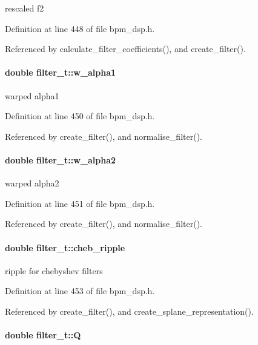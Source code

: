 rescaled f2 

Definition at line 448 of file bpm\_\-dsp.h.

Referenced by calculate\_\-filter\_\-coefficients(), and create\_\-filter().
\paragraph[w\_\-alpha1]{\setlength{\rightskip}{0pt plus 5cm}double {\bf filter\_\-t::w\_\-alpha1}}\hfill\label{structfilter__t_dc08473e572d2bb1b6442d7ccda22d7a}


warped alpha1 

Definition at line 450 of file bpm\_\-dsp.h.

Referenced by create\_\-filter(), and normalise\_\-filter().
\paragraph[w\_\-alpha2]{\setlength{\rightskip}{0pt plus 5cm}double {\bf filter\_\-t::w\_\-alpha2}}\hfill\label{structfilter__t_b1712c2f6e445670dd8e4063f2e281ad}


warped alpha2 

Definition at line 451 of file bpm\_\-dsp.h.

Referenced by create\_\-filter(), and normalise\_\-filter().
\paragraph[cheb\_\-ripple]{\setlength{\rightskip}{0pt plus 5cm}double {\bf filter\_\-t::cheb\_\-ripple}}\hfill\label{structfilter__t_674643ee7b183192df19cd3cd7e38a3d}


ripple for chebyshev filters 

Definition at line 453 of file bpm\_\-dsp.h.

Referenced by create\_\-filter(), and create\_\-splane\_\-representation().
\paragraph[Q]{\setlength{\rightskip}{0pt plus 5cm}double {\bf filter\_\-t::Q}}\hfill\label{structfilter__t_1a2c1f97d417a58cb58346906afc8205}


